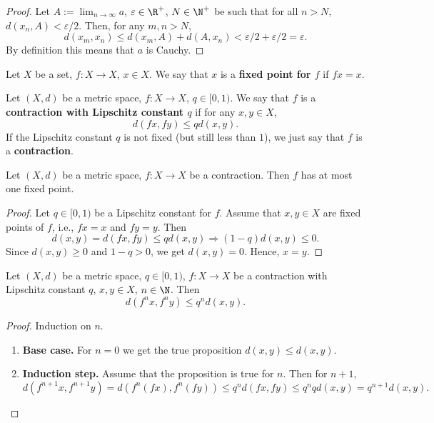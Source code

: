 \begin{proof}
  Let
    $A := \lim_{n \to \infty} a$,
    $\varepsilon \in \R^+$,
    $N \in \N^+$ be such that for all $n > N$, $d(x_n, A) < \varepsilon / 2$.
  Then, for any $m, n > N$,
  \begin{equation}
    d(x_m, x_n)
    \leq d(x_m, A) + d(A, x_n)
    < \varepsilon / 2 + \varepsilon / 2
    = \varepsilon.
  \end{equation}
  By definition this means that $a$ is Cauchy.
\end{proof}
\begin{definition}
  Let
    $X$ be a set,
    $f \colon X \to X$,
    $x \in X$.
  We say that $x$ is a \textbf{fixed point for $f$} if $f x= x$.
\end{definition}
\begin{definition}
  Let $(X, d)$ be a metric space, $f \colon X \to X$, $q \in [0, 1)$.
  We say that $f$ is a \textbf{contraction with Lipschitz constant $q$} if
  for any $x, y \in X$,
  \begin{equation}
    d(f x, f y) \leq q d(x, y).
  \end{equation}
  If the Lipschitz constant $q$ is not fixed (but still less than $1$),
  we just say that $f$ is a \textbf{contraction}.
\end{definition}
\begin{theorem}
  Let
    $(X, d)$ be a metric space,
    $f \colon X \to X$ be a contraction.
  Then $f$ has at most one fixed point.
\end{theorem}
\begin{proof}
  Let $q \in [0, 1)$ be a Lipschitz constant for $f$.
  Assume that $x, y \in X$ are fixed points of $f$,
  i.e., $f x = x$ and $f y = y$.
  Then
  \begin{equation}
    d(x, y) = d(f x, f y) \leq q d(x, y)
    \Rightarrow (1 - q) d(x, y) \leq 0.
  \end{equation}
  Since $d(x, y) \geq 0$ and $1 - q > 0$, we get $d(x, y) = 0$.
  Hence, $x = y$.
\end{proof}
\begin{proposition}
  Let
    $(X, d)$ be a metric space,
    $q \in [0, 1)$,
    $f \colon X \to X$ be a contraction with Lipschitz constant $q$,
    $x, y \in X$,
    $n \in \N$.
  Then
  \begin{equation}
    d(f^n x, f^n y) \leq q^n d(x, y).
  \end{equation}
\end{proposition}
\begin{proof}
  Induction on $n$.
  \begin{enumerate}
    \item
      \textbf{Base case.}
      For $n = 0$ we get the true proposition $d(x, y) \leq d(x, y)$.
    \item
      \textbf{Induction step.}
      Assume that the proposition is true for $n$.
      Then for $n + 1$,
      \begin{equation}
        d(f^{n + 1}x, f^{n + 1} y)
        = d(f^n(f x), f^n(f y))
        \leq q^n d(f x, f y)
        \leq q^n q d(x, y)
        = q^{n + 1} d(x, y).
      \end{equation}
  \end{enumerate}
\end{proof}
